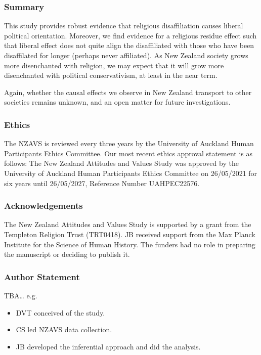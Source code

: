 \documentclass[
  singlecolumn]{article}
\providecommand{\tightlist}{%
  \setlength{\itemsep}{0pt}\setlength{\parskip}{0pt}}\usepackage{longtable,booktabs,array}
\begin{document}
\subsubsection{Summary}\label{summary}

This study provides robust evidence that religious disaffiliation causes
liberal political orientation. Moreover, we find evidence for a
religious residue effect such that liberal effect does not quite align
the disaffiliated with those who have been disaffilated for longer
(perhaps never affiliated). As New Zealand society grows more
disenchanted with religion, we may expect that it will grow more
disenchanted with political conservativism, at least in the near term.

Again, whether the causal effects we observe in New Zealand transport to
other societies remains unknown, and an open matter for future
investigations.

\newpage{}

\subsubsection{Ethics}\label{ethics}

The NZAVS is reviewed every three years by the University of Auckland
Human Participants Ethics Committee. Our most recent ethics approval
statement is as follows: The New Zealand Attitudes and Values Study was
approved by the University of Auckland Human Participants Ethics
Committee on 26/05/2021 for six years until 26/05/2027, Reference Number
UAHPEC22576.

\subsubsection{Acknowledgements}\label{acknowledgements}

The New Zealand Attitudes and Values Study is supported by a grant from
the Templeton Religion Trust (TRT0418). JB received support from the Max
Planck Institute for the Science of Human History. The funders had no
role in preparing the manuscript or deciding to publish it.

\subsubsection{Author Statement}\label{author-statement}

TBA\ldots{} e.g.~

\begin{itemize}
\tightlist
\item
  DVT conceived of the study.
\item
  CS led NZAVS data collection.
\item
  JB developed the inferential approach and did the analysis.
\end{itemize}
\end{document}
